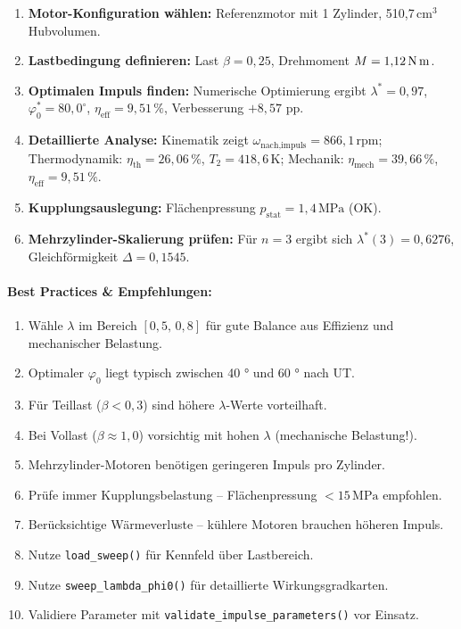 ﻿\documentclass[a4paper,12pt]{article}
\begin{document}
\begin{enumerate}
  \item \textbf{Motor-Konfiguration wählen:} Referenzmotor mit 1 Zylinder,
    510{,}7\,cm$^3$ Hubvolumen.
  \item \textbf{Lastbedingung definieren:} Last $\beta = 0{,}25$, Drehmoment
    $M = 1{,}12\,\text{N\,m}$.
  \item \textbf{Optimalen Impuls finden:} Numerische Optimierung ergibt
    $\lambda^* = 0{,}97$, $\varphi_0^* = 80{,}0^\circ$, $\eta_\text{eff} = 9{,}51\,\%$,
    Verbesserung $+8{,}57$ pp.
  \item \textbf{Detaillierte Analyse:} Kinematik zeigt $\omega_\text{nach,impuls} = 866{,}1\,\text{rpm}$;
    Thermodynamik: $\eta_\text{th} = 26{,}06\,\%$, $T_2 = 418{,}6\,\text{K}$;
    Mechanik: $\eta_\text{mech} = 39{,}66\,\%$, $\eta_\text{eff} = 9{,}51\,\%$.
  \item \textbf{Kupplungsauslegung:} Flächenpressung $p_\text{stat} = 1{,}4\,\text{MPa}$ (OK).
  \item \textbf{Mehrzylinder-Skalierung prüfen:} Für $n=3$ ergibt sich
    $\lambda^*(3) = 0{,}6276$, Gleichförmigkeit $\Delta = 0{,}1545$.
\end{enumerate}

\paragraph{Best Practices \& Empfehlungen:}

\begin{enumerate}
  \item Wähle $\lambda$ im Bereich $[0{,}5,\, 0{,}8]$ für gute Balance aus
    Effizienz und mechanischer Belastung.
  \item Optimaler $\varphi_0$ liegt typisch zwischen 40 ° und 60 ° nach UT.
  \item Für Teillast ($\beta < 0{,}3$) sind höhere $\lambda$-Werte vorteilhaft.
  \item Bei Vollast ($\beta \approx 1{,}0$) vorsichtig mit hohen $\lambda$
    (mechanische Belastung!).
  \item Mehrzylinder-Motoren benötigen geringeren Impuls pro Zylinder.
  \item Prüfe immer Kupplungsbelastung -- Flächenpressung $< 15\,\text{MPa}$ empfohlen.
  \item Berücksichtige Wärmeverluste -- kühlere Motoren brauchen höheren Impuls.
  \item Nutze \texttt{load\_sweep()} für Kennfeld über Lastbereich.
  \item Nutze \texttt{sweep\_lambda\_phi0()} für detaillierte Wirkungsgradkarten.
  \item Validiere Parameter mit \texttt{validate\_impulse\_parameters()} vor Einsatz.
\end{enumerate}
\end{document}
